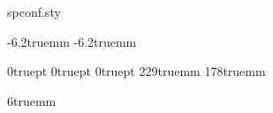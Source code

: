 \begin{filecontents*}{spconf.sty}
\renewcommand{\sfdefault}{phv}
\renewcommand{\rmdefault}{ptm}
\renewcommand{\ttdefault}{pcr}

\oddsidemargin  -6.2truemm
\evensidemargin -6.2truemm

\topmargin 0truept
\headheight 0truept
\headsep 0truept
\textheight 229truemm
\textwidth 178truemm

\twocolumn
\columnsep 6truemm
\pagestyle{empty}

\emergencystretch=11pt

\def\ninept{\def\baselinestretch{.95}\let\normalsize\small\normalsize}

\def\maketitle{\par
 \begingroup
 \def\thefootnote{}
 \def\@makefnmark{\hbox
 {$^{\@thefnmark}$\hss}}
 \if@twocolumn
 \twocolumn[\@maketitle]
 \else \newpage
 \global\@topnum\z@ \@maketitle \fi\@thanks
 \endgroup
 \setcounter{footnote}{0}
 \let\maketitle\relax
 \let\@maketitle\relax
 \gdef\thefootnote{\arabic{footnote}}\gdef\@@savethanks{}%
 \gdef\@thanks{}\gdef\@author{}\gdef\@title{}\let\thanks\relax}

\def\@maketitle{\newpage
 \null
 \vskip 2em \begin{center}
 {\large \bf \@title \par} \vskip 1.5em {\large \lineskip .5em
\begin{tabular}[t]{c}\@name \\ \@address
 \end{tabular}\par} \end{center}
 \par
 \vskip 1.5em}


\end{filecontents*}
